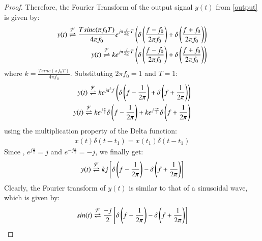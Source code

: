 \documentclass[journal,12pt,twocolumn]{IEEEtran}
\begin{document}
\begin{proof}
Therefore, the Fourier Transform of the output signal $y(t)$ from \eqref{output} is given by:
 \begin{align}
     y(t) \overset{\mathcal{F}}{ \rightleftharpoons} \frac{Tsinc(\pi f_0 T)}{4\pi f_0}e^{j\pi \frac{f}{2f_0}T}\left(\delta\left(\frac{f - f_0}{2\pi f_0}\right) + \delta\left(\frac{f + f_0}{2\pi f_0}\right)\right)\\
     y(t) \overset{\mathcal{F}}{ \rightleftharpoons} ke^{j\pi \frac{f}{2f_0}T}\left(\delta\left(\frac{f - f_0}{2\pi f_0}\right) + \delta\left(\frac{f + f_0}{2\pi f_0}\right)\right)
 \end{align}
 where $k = \frac{Tsinc(\pi f_0T)}{4\pi f_0}$. Substituting $2\pi f_0 = 1$ and $T = 1$:
 \begin{align}
     y(t) \overset{\mathcal{F}}{ \rightleftharpoons} ke^{j\pi^2f}\left(\delta\left(f - \frac{1}{2\pi}\right) + \delta\left(f + \frac{1}{2\pi}\right)\right)\\
     y(t) \overset{\mathcal{F}}{ \rightleftharpoons} ke^{j\frac{\pi}{2}}\delta\left(f - \frac{1}{2\pi}\right) +ke^{j\frac{-\pi}{2}}\delta\left(f + \frac{1}{2\pi}\right)
 \end{align}
 using the multiplication property of the Delta function:
 \begin{align}
     x(t)\delta(t - t_1) = x(t_1)\delta(t - t_1)
 \end{align}
 Since , $e^{j\frac{\pi}{2}} = j$ and $e^{-j\frac{\pi}{2}} = -j$, we finally get:
 \begin{align}
 y(t) \overset{\mathcal{F}}{ \rightleftharpoons} kj{}\left[\delta\left(f - \frac{1}{2\pi}\right) - \delta\left(f + \frac{1}{2\pi}\right)\right]
 \end{align}
 Clearly, the Fourier transform of $y(t)$ is similar to that of a sinusoidal wave, which is given by:
 \begin{align}
     sin(t) \overset{\mathcal{F}}{ \rightleftharpoons} \frac{-j}{2}{}\left[\delta\left(f-\frac{1}{2\pi}\right) - \delta\left(f + \frac{1}{2\pi}\right)\right]
 \end{align}


\end{proof}
\end{document}
